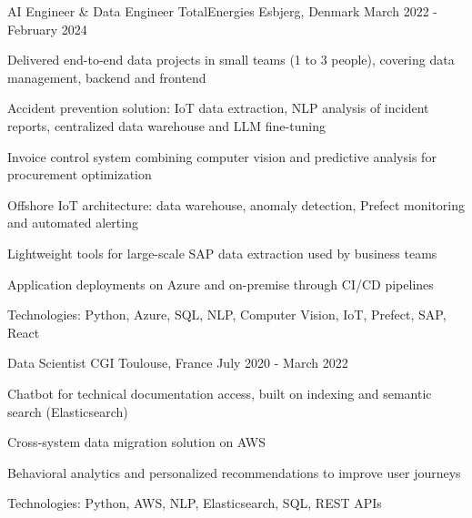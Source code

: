 \begin{cventries}
\vspace{1.5em}


\cventry
{AI Engineer \& Data Engineer} %
{TotalEnergies} %
{Esbjerg, Denmark} %
{March 2022 - February 2024} %
{ %
\begin{cvitems}
\item {Delivered end-to-end data projects in small teams (1 to 3 people), covering data management, backend and frontend}
\item {Accident prevention solution: IoT data extraction, NLP analysis of incident reports, centralized data warehouse and LLM fine-tuning}
\item {Invoice control system combining computer vision and predictive analysis for procurement optimization}
\item {Offshore IoT architecture: data warehouse, anomaly detection, Prefect monitoring and automated alerting}
\item {Lightweight tools for large-scale SAP data extraction used by business teams}
\item {Application deployments on Azure and on-premise through CI/CD pipelines}
\item {Technologies: Python, Azure, SQL, NLP, Computer Vision, IoT, Prefect, SAP, React}
\end{cvitems}
}
\vspace{1.5em}


\cventry
{Data Scientist} %
{CGI} %
{Toulouse, France} %
{July 2020 - March 2022} %
{ %
\begin{cvitems}
\item {Chatbot for technical documentation access, built on indexing and semantic search (Elasticsearch)}
\item {Cross-system data migration solution on AWS}
\item {Behavioral analytics and personalized recommendations to improve user journeys}
\item {Technologies: Python, AWS, NLP, Elasticsearch, SQL, REST APIs}
\end{cvitems}
}


\end{cventries}
